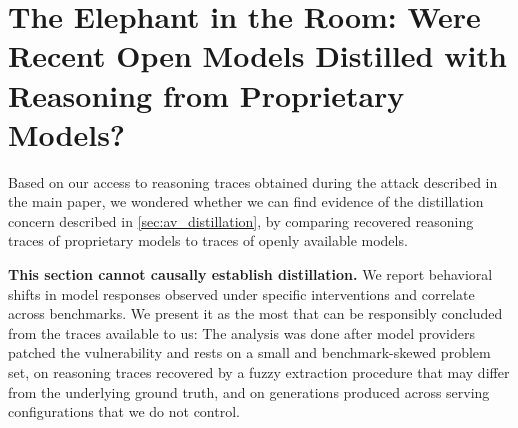 

 
 
 
 
 

 
 
 
 


 

 


 
 
 


\section{The Elephant in the Room: Were Recent Open Models Distilled with Reasoning from Proprietary Models?}
\label{app:appendix_b_faq}


Based on our access to reasoning traces obtained during the attack described in the main paper, we wondered whether we can find evidence of the distillation concern described in \cref{sec:av_distillation}, by comparing recovered reasoning traces of proprietary models to traces of openly available models.
 
\begin{tcolorbox}[colback=green!5!white, colframe=green!55!black,
  title=\textbf{Disclaimer: Scope and limitations of this analysis}]
\textbf{This section cannot causally establish distillation.} We report behavioral shifts in model responses observed under specific interventions and correlate across benchmarks. We present it as the most that can be responsibly concluded from the traces available to us: The analysis was done after model providers patched the vulnerability and rests on a small and benchmark-skewed problem set, on reasoning traces recovered by a fuzzy extraction procedure that may differ from the underlying ground truth, and on generations produced across serving configurations that we do not control.

\end{tcolorbox}






